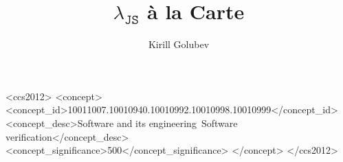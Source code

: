 \documentclass[sigplan,nonacm]{acmart}
\begin{document}
\title{$\lambda_{\texttt{JS}}$ à la Carte}

\author{Kirill Golubev}


\renewcommand{\shortauthors}{Golubev}

\begin{CCSXML}
<ccs2012>
 <concept>
<concept_id>10011007.10010940.10010992.10010998.10010999</concept_id>
<concept_desc>Software and its engineering~Software verification</concept_desc>
<concept_significance>500</concept_significance>
</concept>
</ccs2012>
\end{CCSXML}




\maketitle
\end{document}

